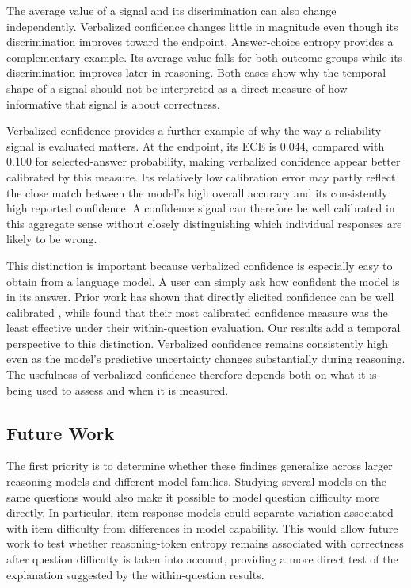 \documentclass{article}
\begin{document}
The average value of a signal and its discrimination can also change independently. Verbalized confidence changes little in magnitude even though its discrimination improves toward the endpoint. Answer-choice entropy provides a complementary example. Its average value falls for both outcome groups while its discrimination improves later in reasoning. Both cases show why the temporal shape of a signal should not be interpreted as a direct measure of how informative that signal is about correctness.

Verbalized confidence provides a further example of why the way a reliability signal is evaluated matters. At the endpoint, its ECE is 0.044, compared with 0.100 for selected-answer probability, making verbalized confidence appear better calibrated by this measure. Its relatively low calibration error may partly reflect the close match between the model's high overall accuracy and its consistently high reported confidence. A confidence signal can therefore be well calibrated in this aggregate sense without closely distinguishing which individual responses are likely to be wrong.

This distinction is important because verbalized confidence is especially easy to obtain from a language model. A user can simply ask how confident the model is in its answer. Prior work has shown that directly elicited confidence can be well calibrated \citep{tian2023calibration}, while \citet{taubenfeld2025confidence} found that their most calibrated confidence measure was the least effective under their within-question evaluation. Our results add a temporal perspective to this distinction. Verbalized confidence remains consistently high even as the model's predictive uncertainty changes substantially during reasoning. The usefulness of verbalized confidence therefore depends both on what it is being used to assess and when it is measured.

\subsection{Future Work}

The first priority is to determine whether these findings generalize across larger reasoning models and different model families. Studying several models on the same questions would also make it possible to model question difficulty more directly. In particular, item-response models could separate variation associated with item difficulty from differences in model capability. This would allow future work to test whether reasoning-token entropy remains associated with correctness after question difficulty is taken into account, providing a more direct test of the explanation suggested by the within-question results.
\end{document}
